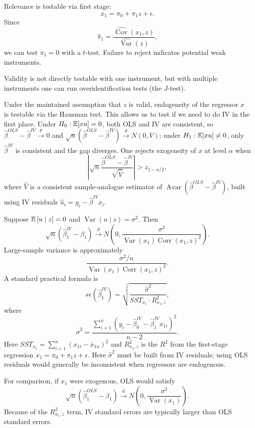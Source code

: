 \begin{remark}
	Relevance is testable via first stage: \[
		x_1 = \pi_0 + \pi_1 z + \epsilon
	.\]
	Since \[
		\hat{\pi}_1 = \frac{\widehat{\operatorname{Cov}}(x_1, z)}{\widehat{\operatorname{Var}}(z)}
	,\]
	we can test $\pi_1=0$ with a $t$-test. Failure to reject indicates potential weak instruments.

	Validity is not directly testable with one instrument, but with multiple instruments one can run overidentification tests (the $J$-test).

	Under the maintained assumption that $z$ is valid, endogeneity of the regressor $x$ is testable via the Hausman test. This allows us to test if we need to do IV in the first place. Under $H_0:\mathbb{E}[xu]=0$, both OLS and IV are consistent, so $\hat{\beta}^{OLS}-\hat{\beta}^{IV}\xrightarrow{p}0$ and $\sqrt{n}(\hat{\beta}^{OLS}-\hat{\beta}^{IV})\xrightarrow{d}N(0,V)$; under $H_1:\mathbb{E}[xu]\ne0$, only $\hat{\beta}^{IV}$ is consistent and the gap diverges. One rejects exogeneity of $x$ at level $\alpha$ when \[
		\left|\sqrt{n}\frac{\hat{\beta}^{OLS}-\hat{\beta}^{IV}}{\sqrt{\hat{V}}}\right|>z_{1-\alpha/2}
	,\] where $\hat{V}$ is a consistent sample-analogue estimator of $\operatorname{Avar}(\hat{\beta}^{OLS}-\hat{\beta}^{IV})$, built using IV residuals $\hat{u}_i=y_i-\hat{\beta}^{IV}x_i$.
\end{remark}

\begin{proposition}
	Suppose $\mathbb{E}\left[u \mid z\right]=0$ and $\operatorname{Var}(u \mid z)=\sigma^2$. Then \[
		\sqrt{n}\left(\hat{\beta}_1^{IV}-\beta_1\right) \xrightarrow{d} N\left(0, \frac{\sigma^2}{\operatorname{Var}(x_1)\operatorname{Corr}(x_1,z)^2}\right)
	.\]
	Large-sample variance is approximately \[
		\frac{\sigma^2/n}{\operatorname{Var}(x_1)\operatorname{Corr}(x_1,z)^2}
	.\]
	A standard practical formula is \[
		se\left(\hat{\beta}_1^{IV}\right) = \sqrt{\frac{\hat{\sigma}^2}{SST_{x_1} \cdot R_{x_1,z}^2}}
	,\]
	where \[
		\hat{\sigma}^2 = \frac{\sum_{i=1}^{n}\left(y_i-\hat{\beta}_0^{IV}-\hat{\beta}_1^{IV}x_{1i}\right)^2}{n-2}
	.\]
	Here $SST_{x_1}=\sum_{i=1}^{n}(x_{1i}-\bar{x}_{1n})^2$ and $R_{x_1,z}^2$ is the $R^2$ from the first-stage regression $x_1=\pi_0+\pi_1 z+\epsilon$.
	Here $\hat{\sigma}^2$ must be built from IV residuals; using OLS residuals would generally be inconsistent when regressors are endogenous.

	For comparison, if $x_1$ were exogenous, OLS would satisfy \[
		\sqrt{n}\left(\hat{\beta}_1^{OLS}-\beta_1\right) \xrightarrow{d} N\left(0, \frac{\sigma^2}{\operatorname{Var}(x_1)}\right)
	.\]
	Because of the $R_{x_1,z}^2$ term, IV standard errors are typically larger than OLS standard errors.
\end{proposition}

